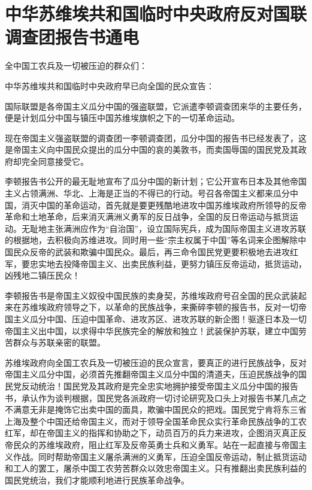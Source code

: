 \section[中华苏维埃共和国临时中央政府反对国联调查团报告书通电（一九三二年十月六日）]{中华苏维埃共和国临时中央政府反对国联调查团报告书通电}


全中国工农兵及一切被压迫的群众们：

中华苏维埃共和国临时中央政府早已向全国的民众宣告：

国际联盟是各帝国主义瓜分中国的强盗联盟，它派遣李顿调查团来华的主要任务，便是计划瓜分中国与镇压中国苏维埃旗帜之下的一切革命运动。

现在帝国主义强盗联盟的调查团一李顿调查团，瓜分中国的报告书已经发表了，这是帝国主义向中国民众提出的瓜分中国的哀的美敦书，而卖国辱国的国民党及其政府却完全同意接受它。

李顿报告书公开的最无耻地宣布了瓜分中国的新计划；它公开宣布日本及其他帝国主义占领满洲、华北、上海是正当的不得已的行动。号召各帝国主义都来瓜分中国，消灭中国的革命运动，首先就是要更残酷地进攻中国苏维埃政府所领导的反帝革命和土地革命，后来消灭满洲义勇军的反日战争，全国的反日帝运动与抵货运动。无耻地主张满洲应作为“自治国”，设立国际宪兵，成为国际帝国主义进攻苏联的根据地，去积极向苏维进攻。同时用一些“宗主权属于中国”等名词来企图解除中国民众反帝的武装和欺骗中国民众。最后，再三命令国民党更要积极地去进攻红军，要忠实地去投降帝国主义、出卖民族利益，更努力镇压反帝运动，抵货运动，凶残地二镇压民众！

李顿报告书是帝国主义奴役中国民族的卖身契，苏维埃政府号召全国的民众武装起来在苏维埃政府领导之下，以革命的民族战争，来撕碎李顿的报告书，反对一切帝国主义瓜分中国、压迫中国革命、进攻苏区、进攻苏联的新企图！驱逐日本及一切帝国主义出中国，以求得中华民族完全的解放和独立！武装保护苏联，建立中国劳苦群众与苏联亲密的联盟。

苏维埃政府向全国工农兵及一切被压迫的民众宣言，要真正的进行民族战争，反对帝国主义瓜分中国，必须首先推翻帝国主义瓜分中国的清道夫，压迫民族战争的国民党反动统治！国民党及其政府是完全忠实地拥护接受帝国主义瓜分中国的报告书，承认作为谈判根据，国民党各派政府一切讨论研究及口头上对报告书某几点之不满意无非是掩饰它出卖中国的面具，欺骗中国民众的把戏。国民党宁肯将东三省上海及整个中国还给帝国主义，而对于领导全国革命民众实行革命民族战争的工农红军，却在帝国主义的指挥和协助之下，动员百万的兵力来进攻，企图消灭真正反帝民众的苏维埃政府，阻止红军及反帝英勇士兵和义勇军。站在一起直接与帝国主义作战。同时帮助帝国主义屠杀满洲的义勇军，压迫全国反帝运动，制止抵货运动和工人的罢工，屠杀中国工农劳苦群众以效忠帝国主义。只有推翻出卖民族利益的国民党统治，我们才能顺利地进行民族革命战争。

